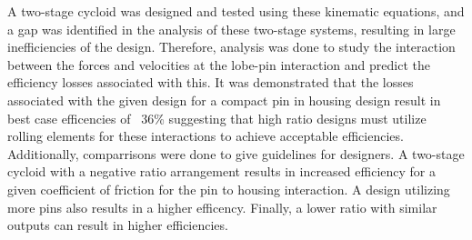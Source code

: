 A two-stage cycloid was designed and tested using these kinematic equations, and a gap was identified in the analysis of these two-stage systems, resulting in large inefficiencies of the design. Therefore, analysis was done to study the interaction between the forces and velocities at the lobe-pin interaction and predict the efficiency losses associated with this. It was demonstrated that the losses associated with the given design for a compact pin in housing design result in best case efficencies of ~36\% suggesting that high ratio designs must utilize rolling elements for these interactions to achieve acceptable efficiencies. Additionally, comparrisons were done to give guidelines for designers. A two-stage cycloid with a negative ratio arrangement results in increased efficiency for a given coefficient of friction for the pin to housing interaction. A design utilizing more pins also results in a higher efficency. Finally, a lower ratio with similar outputs can result in higher efficiencies. 


